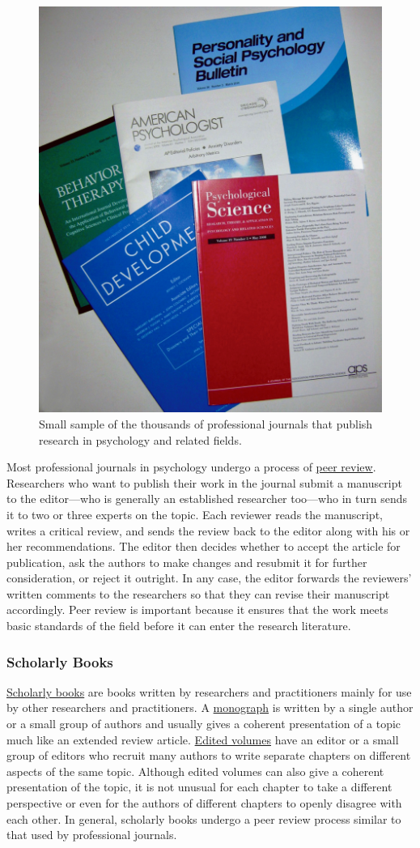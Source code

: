 \documentclass[
]{krantz}
\begin{document}
\begin{figure}

{\centering \includegraphics[width=0.4\linewidth]{images/ideas/journals} 

}

\caption{Small sample of the thousands of professional journals that publish research in psychology and related fields.}\label{fig:journals}
\end{figure}

Most professional journals in psychology undergo a process of \protect\hyperlink{peer-review}{peer review}. Researchers who want to publish their work in the journal submit a manuscript to the editor---who is generally an established researcher too---who in turn sends it to two or three experts on the topic. Each reviewer reads the manuscript, writes a critical review, and sends the review back to the editor along with his or her recommendations. The editor then decides whether to accept the article for publication, ask the authors to make changes and resubmit it for further consideration, or reject it outright. In any case, the editor forwards the reviewers' written comments to the researchers so that they can revise their manuscript accordingly. Peer review is important because it ensures that the work meets basic standards of the field before it can enter the research literature.

\hypertarget{scholarly-books}{%
\subsubsection*{Scholarly Books}\label{scholarly-books}}


\protect\hyperlink{scholarly-book}{Scholarly books} are books written by researchers and practitioners mainly for use by other researchers and practitioners. A \protect\hyperlink{monograph}{monograph} is written by a single author or a small group of authors and usually gives a coherent presentation of a topic much like an extended review article. \protect\hyperlink{edited-volume}{Edited volumes} have an editor or a small group of editors who recruit many authors to write separate chapters on different aspects of the same topic. Although edited volumes can also give a coherent presentation of the topic, it is not unusual for each chapter to take a different perspective or even for the authors of different chapters to openly disagree with each other. In general, scholarly books undergo a peer review process similar to that used by professional journals.
\end{document}
